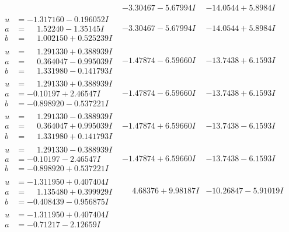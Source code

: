 \documentclass[1p]{elsarticle_modified}
\theoremstyle{definition}
\begin{document}
$$\begin{array}{c|c|c}
 & -3.30467 - 5.67994 I & -14.0544 + 5.8984 I \\ \hline\begin{aligned}
u &= -1.317160 - 0.196052 I \\
a &= \phantom{-}1.52240 - 1.35145 I \\
b &= \phantom{-}1.002150 + 0.525239 I\end{aligned}
 & -3.30467 - 5.67994 I & -14.0544 + 5.8984 I \\ \hline\begin{aligned}
u &= \phantom{-}1.291330 + 0.388939 I \\
a &= \phantom{-}0.364047 - 0.995039 I \\
b &= \phantom{-}1.331980 - 0.141793 I\end{aligned}
 & -1.47874 - 6.59660 I & -13.7438 + 6.1593 I \\ \hline\begin{aligned}
u &= \phantom{-}1.291330 + 0.388939 I \\
a &= -0.10197 + 2.46547 I \\
b &= -0.898920 - 0.537221 I\end{aligned}
 & -1.47874 - 6.59660 I & -13.7438 + 6.1593 I \\ \hline\begin{aligned}
u &= \phantom{-}1.291330 - 0.388939 I \\
a &= \phantom{-}0.364047 + 0.995039 I \\
b &= \phantom{-}1.331980 + 0.141793 I\end{aligned}
 & -1.47874 + 6.59660 I & -13.7438 - 6.1593 I \\ \hline\begin{aligned}
u &= \phantom{-}1.291330 - 0.388939 I \\
a &= -0.10197 - 2.46547 I \\
b &= -0.898920 + 0.537221 I\end{aligned}
 & -1.47874 + 6.59660 I & -13.7438 - 6.1593 I \\ \hline\begin{aligned}
u &= -1.311950 + 0.407404 I \\
a &= \phantom{-}1.135480 + 0.399929 I \\
b &= -0.408439 - 0.956875 I\end{aligned}
 & \phantom{-}4.68376 + 9.98187 I & -10.26847 - 5.91019 I \\ \hline\begin{aligned}
u &= -1.311950 + 0.407404 I \\
a &= -0.71217 - 2.12659 I \\

\end{aligned}
\end{array}$$
\end{document}
